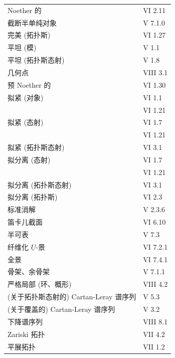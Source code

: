 \begin{longtable}{@{}p{.68\linewidth}p{.27\linewidth}@{}}
Noether 的 & VI 2.11\\
截断半单纯对象 & V 7.1.0\\
完美 (拓扑斯) & VI 1.27\\
平坦 (模) & V 1.1\\
平坦 (拓扑斯态射) & V 1.8\\
几何点 & VIII 3.1\\
预 Noether 的 & VI 1.30\\
拟紧 (对象) & VI 1.1\\
& VI 1.21\\
拟紧 (态射) & VI 1.7\\
& VI 1.21\\
拟紧 (拓扑斯态射) & VI 3.1\\[.7em]
拟分离 (态射) & VI 1.7\\
& VI 1.21\\
拟分离 (拓扑斯态射) & VI 3.1\\
拟分离 (拓扑斯) & VI 2.3\\
标准消解 & V 2.3.6\\
笛卡儿截面 & VI 6.10\\
半可表 & V 7.3\\
纤维化 $\underline U$-景 & VI 7.2.1\\
全景 & VI 7.4.1\\
骨架、余骨架 & V 7.1.1\\
严格局部 (环、概形) & VIII 4.2\\
(关于拓扑斯态射的) Cartan-Leray 谱序列 & V 5.3\\
(关于覆盖的) Cartan-Leray 谱序列 & V 3.2\\
下降谱序列 & VIII 8.1\\
Zariski 拓扑 & VII 4.2\\
平展拓扑 & VII 1.2\\

\end{longtable}
